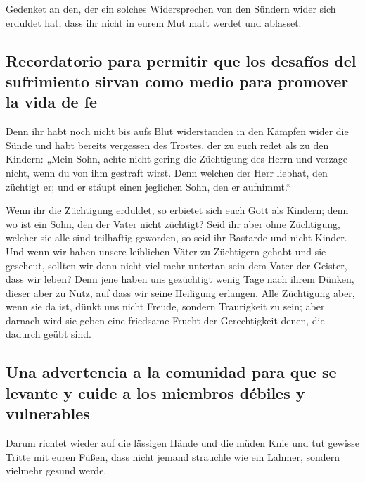  Gedenket an den, der ein solches Widersprechen von den
Sündern wider sich erduldet hat, dass ihr nicht in eurem Mut matt werdet
und ablasset.

\hypertarget{recordatorio-para-permitir-que-los-desafuxedos-del-sufrimiento-sirvan-como-medio-para-promover-la-vida-de-fe}{%
\subsection{Recordatorio para permitir que los desafíos del sufrimiento
sirvan como medio para promover la vida de
fe}\label{recordatorio-para-permitir-que-los-desafuxedos-del-sufrimiento-sirvan-como-medio-para-promover-la-vida-de-fe}}

 Denn ihr habt noch nicht bis aufs Blut widerstanden in
den Kämpfen wider die Sünde  und habt bereits vergessen
des Trostes, der zu euch redet als zu den Kindern: „Mein Sohn, achte
nicht gering die Züchtigung des Herrn und verzage nicht, wenn du von ihm
gestraft wirst.  Denn welchen der Herr liebhat, den
züchtigt er; und er stäupt einen jeglichen Sohn, den er aufnimmt.``

 Wenn ihr die Züchtigung erduldet, so erbietet sich euch
Gott als Kindern; denn wo ist ein Sohn, den der Vater nicht züchtigt?
 Seid ihr aber ohne Züchtigung, welcher sie alle sind
teilhaftig geworden, so seid ihr Bastarde und nicht Kinder.
 Und wenn wir haben unsere leiblichen Väter zu Züchtigern
gehabt und sie gescheut, sollten wir denn nicht viel mehr untertan sein
dem Vater der Geister, dass wir leben?  Denn jene haben
uns gezüchtigt wenig Tage nach ihrem Dünken, dieser aber zu Nutz, auf
dass wir seine Heiligung erlangen.  Alle Züchtigung aber,
wenn sie da ist, dünkt uns nicht Freude, sondern Traurigkeit zu sein;
aber darnach wird sie geben eine friedsame Frucht der Gerechtigkeit
denen, die dadurch geübt sind.

\hypertarget{una-advertencia-a-la-comunidad-para-que-se-levante-y-cuide-a-los-miembros-duxe9biles-y-vulnerables}{%
\subsection{Una advertencia a la comunidad para que se levante y cuide a
los miembros débiles y
vulnerables}\label{una-advertencia-a-la-comunidad-para-que-se-levante-y-cuide-a-los-miembros-duxe9biles-y-vulnerables}}

 Darum richtet wieder auf die lässigen Hände und die
müden Knie  und tut gewisse Tritte mit euren Füßen, dass
nicht jemand strauchle wie ein Lahmer, sondern vielmehr gesund werde.

